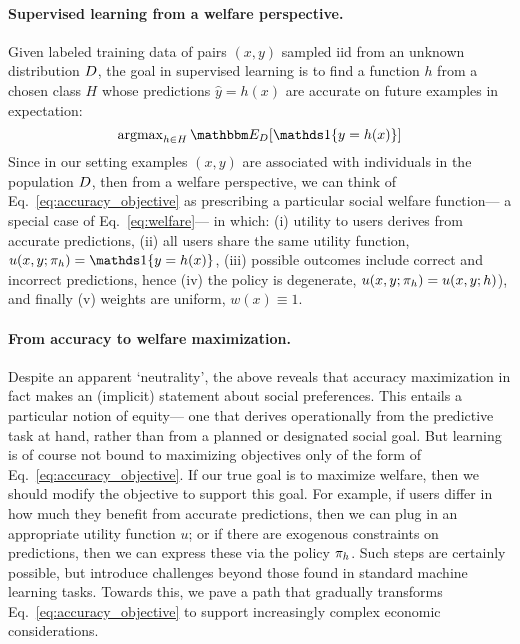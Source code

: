 \paragraph{Supervised learning from a welfare perspective.}
Given labeled training data of pairs $(x,y)$ sampled iid from an unknown distribution ${D}$,
the goal in supervised learning is to find a function $h$ from a chosen class $H$ whose predictions $\hat{y}=h(x)$ are accurate
on future examples in expectation:
\begin{equation}
\label{eq:accuracy_objective}
\argmax\nolimits_{h \in H} \expect{\dist}{\one{y = h(x)}}
\end{equation}
Since in our setting examples $(x,y)$ are associated with individuals
in the population ${D}$,
then from a welfare perspective,
we can think of Eq.~\eqref{eq:accuracy_objective}
as prescribing a particular social welfare function---%
a special case of Eq.~\eqref{eq:welfare}---%
in which:
(i) utility to users derives from accurate predictions,
(ii) all users share the same utility function,
$u(x,y;\policy_h) = \one{y = h(x)}$,
(iii) possible outcomes include correct and incorrect predictions,
hence (iv) the policy is degenerate, $u(x,y;{\pi}_h)=u(x,y;h)$),
and finally (v) weights are uniform, $w(x) \equiv 1$.
\squeeze


\paragraph{From accuracy to welfare maximization.}
Despite an apparent `neutrality', 
the above reveals that
accuracy maximization in fact makes an (implicit)
statement about social preferences.
This entails a particular notion of equity---%
one that derives operationally from the predictive task at hand,
rather than from a planned or designated social goal.
But learning is of course not bound to maximizing objectives only of the form of Eq.~\eqref{eq:accuracy_objective}.
If our true goal is to maximize welfare, then we should modify the objective to support this goal.
For example, if users differ in how much they benefit from accurate predictions,
then we can plug in an appropriate utility function $u$;
or if there are exogenous constraints on predictions,
then we can express these via the policy ${\pi}_h$.
Such steps are certainly possible, but introduce challenges beyond those
found in standard machine learning tasks.
Towards this, we pave a path that
gradually transforms Eq.~\eqref{eq:accuracy_objective} to support increasingly complex economic considerations.


